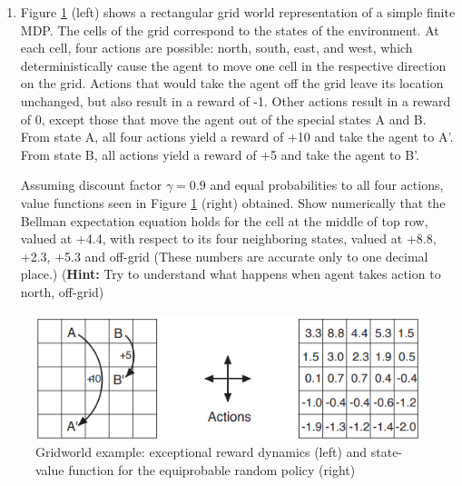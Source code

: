 \documentclass[11pt,onecolumn]{article}
\begin{document}
\begin{enumerate}
    \item Figure \ref{fig:book3.14} (left) shows a rectangular grid world representation of a simple finite MDP. The cells of the grid correspond to the states of the environment. At each cell, four actions are possible: north, south, east, and west, which deterministically cause the agent to move one cell in the respective direction on the grid. Actions that would take the agent off the grid leave its location unchanged, but also result in a reward of -1. Other actions result in a reward of 0, except those that move the agent out of the special states A and B. From state A, all four actions yield a reward of +10 and take the agent to A'. From state B, all actions yield a reward of +5 and take the agent to B'. 
    
    Assuming discount factor $\gamma=0.9$ and equal probabilities to all four actions, value functions seen in Figure \ref{fig:book3.14} (right) obtained. Show numerically that the Bellman expectation equation holds for the cell at the middle of top row, valued at +4.4, with respect to its four neighboring states, valued at +8.8, +2.3, +5.3 and off-grid (These numbers are accurate only to one decimal place.) (\textbf{Hint:} Try to understand what happens when agent takes action to north, off-grid)
    
\end{enumerate}

\begin{figure}[htbp]
    \centering
    \includegraphics[width=0.6\linewidth]{figures/mdp_grid.png}
    
    \caption{Gridworld example: exceptional reward dynamics (left) and state-value function for the equiprobable random policy (right)}
    \label{fig:book3.14}
\end{figure}
\end{document}
